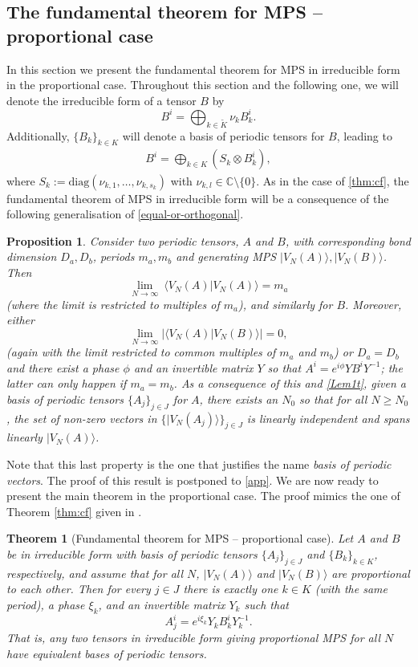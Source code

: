 \documentclass[pra,a4paper,notitlepage,nofootinbib,superscriptaddress]{revtex4-1}
\theoremstyle{plain}
\newtheorem{theorem}[lemma]{Theorem}
\newtheorem{proposition}[lemma]{Proposition}
\newcommand{\1}{{\openone}}
\newcommand{\be}{\begin{eqnarray}}
\newcommand{\ee}{\end{eqnarray}}
\newcommand{\ra}{\rangle}
\newcommand{\diag}{\mathrm{diag}}
\begin{document}
\subsection{The fundamental theorem for MPS -- proportional case}
\label{ssec:thmprop}

In this section we present the fundamental theorem for MPS in irreducible form in the proportional case. Throughout this section and the following one, we will denote the irreducible form of a tensor $B$ by
$$
    B^i= \bigoplus_{k\in \tilde{K}} \nu_k B^i_k.
$$
Additionally, $\{B_k\}_{k\in K}$ will denote a basis of periodic tensors for $B$, leading to
\be
    B^i= \bigoplus_{k\in {K}} \left( S_k\otimes B^i_k\right),
    \label{eq:Bbdnr}
\ee
where $S_k := \diag(\nu_{k,1},\ldots, \nu_{k,s_k})$ with  $\nu_{k,l}\in
    \mathbb{C}\setminus\{0\}$.  As in the case of \cref{thm:cf},  the fundamental theorem of
MPS in irreducible form will be a consequence of the following
generalisation of  \cref{equal-or-orthogonal}.

\begin{proposition}\label{equal-or-orthogonal-generalized}
    Consider two periodic tensors, $A$ and $B$, with corresponding bond dimension $D_a, D_b$, periods $m_a,m_b$ and generating MPS $|V_N(A)\ra, |V_N(B)\ra$.
    Then
    $$
        \lim_{N \to \infty }
        \: \langle V_N(A)|V_N(A)\rangle=m_a
    $$
    (where the limit is restricted to multiples of $m_a$),
    and similarly for $B$.  Moreover, either
    $$
        \lim_{N\to\infty} |\langle V_N(A)|V_N(B)\rangle|=0 ,
    $$
    (again with the limit restricted to common multiples of $m_a$ and $m_b$)
    or $D_a=D_b$ and there exist a phase $\phi$ and an invertible matrix $Y$
    so that $A^i= e^{i\phi} Y  B^i  Y^{-1}$; the latter can only happen if
    $m_a=m_b$.  As a consequence of this and  \cref{Lem1t},
    given a basis of periodic tensors $\{A_j\}_{j\in J}$ for $A$,  there
    exists an $N_0$ so that for all $N\ge N_0$, the set of non-zero vectors in
    $\{|V_N(A_j)\ra\}_{j\in J}$ is linearly independent and spans linearly
    $|V_N(A)\ra$.
\end{proposition}

Note that this last property is the one that justifies the name {\it basis of periodic vectors}. The proof of this result is postponed to \cref{app}.  We are now ready to present the main theorem in the proportional case. The proof mimics the one of Theorem \ref{thm:cf} given in \cite{Ci15}.

\begin{theorem}[Fundamental theorem for MPS -- proportional case]\label{thm:bd}
    Let $A$ and $B$ be in irreducible form with basis of periodic tensors $\{A_j\}_{j\in J}$ and $\{B_k\}_{k\in K}$, respectively, and assume that for all $N$,
    $|V_N(A)\ra $ and $ |V_N(B)\ra$ are proportional to each other.
    Then for every $j\in J$ there is exactly one $k\in K$ (with the same period), a phase $\xi_k$, and
    an invertible  matrix $Y_k$ such that
    $$
        A_j^i = e^{i\xi_k} Y_k B_k^i Y_k^{-1}.
    $$
    That is, any two tensors in irreducible form giving proportional MPS for
    all $N$ have equivalent bases of periodic tensors.
\end{theorem}
\end{document}
